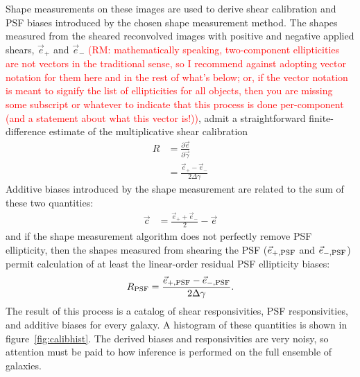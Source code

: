 \documentclass[iop]{emulateapj}
\newcommand\rmcomment[1]{\textcolor{red}{(RM: #1)}}
\begin{document}
Shape measurements on these images are used to derive shear
calibration and PSF biases {introduced by the chosen shape measurement
  method}. The shapes measured from the sheared reconvolved images with positive and negative
applied shears,
$\vec{e}_{+}$ and $\vec{e}_{-}$ \rmcomment{mathematically speaking, two-component ellipticities are not vectors in
  the traditional sense, so I recommend against adopting vector notation for them here and in the
  rest of what's below; or, if the vector notation is meant to signify the list of ellipticities for
all objects, then you are missing some subscript or whatever to indicate that this process is done
per-component (and a statement about what this vector is!)}, admit a straightforward
finite-difference estimate of the multiplicative shear calibration
\begin{align}
R &= \frac{\partial \vec{e}}{\partial \vec{\gamma}}  \\
 &=\frac{\vec{e}_{+} - \vec{e}_{-}}{2\Delta\gamma}
\end{align}
Additive biases introduced by the shape measurement are related to the sum of these two quantities:
\begin{align}
\vec{c} &= \frac{\vec{e}_{+} + \vec{e}_{-}}{2} - \vec{e}
\end{align}
and if the shape measurement algorithm does not perfectly remove PSF
ellipticity, then the shapes measured from shearing the PSF
($\vec{e}_{+,\rm PSF}$ and $\vec{e}_{-,\rm PSF}$) permit calculation
of at least the linear-order residual PSF ellipticity biases:
\begin{align}
R_{\rm PSF} = \frac{\vec{e}_{+,\rm PSF} - \vec{e}_{-,\rm PSF}}{2\Delta\gamma}.
\end{align}
The result of this process is a catalog of shear responsivities, PSF
responsivities, and additive biases for every galaxy. A histogram of
these quantities is shown in figure~\ref{fig:calibhist}. The derived
biases and responsivities are very noisy, so attention must be paid to
how inference is performed on the full ensemble of galaxies.
\end{document}
